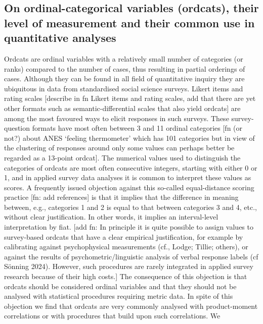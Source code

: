 \documentclass[
  12pt,
]{article}
\begin{document}
\subsection{On ordinal-categorical variables (ordcats), their level of
measurement and their common use in quantitative
analyses}\label{on-ordinal-categorical-variables-ordcats-their-level-of-measurement-and-their-common-use-in-quantitative-analyses}

Ordcats are ordinal variables with a relatively small number of
categories (or ranks) compared to the number of cases, thus resulting in
partial orderings of cases. Although they can be found in all field of
quantitative inquiry they are ubiquitous in data from standardised
social science surveys. Likert items and rating scales {[}describe in fn
Likert items and rating scales, add that there are yet other formats
such as semantic-differential scales that also yield ordcats{]} are
among the most favoured ways to elicit responses in such surveys. These
survey-question formats have most often between 3 and 11 ordinal
categories {[}fn (or not?) about ANES `feeling thermometer' which has
101 categories but in view of the clustering of responses around only
some values can perhaps better be regarded as a 13-point ordcat{]}. The
numerical values used to distinguish the categories of ordcats are most
often consecutive integers, starting with either 0 or 1, and in applied
survey data analyses it is common to interpret these values as scores. A
frequently issued objection against this so-called equal-distance
scoring practice {[}fn: add references{]} is that it implies that the
difference in meaning between, e.g., categories 1 and 2 is equal to that
between categories 3 and 4, etc., without clear justification. In other
words, it implies an interval-level interpretation by fiat. {[}add fn:
In principle it is quite possible to assign values to survey-based
ordcats that have a clear empirical justification, for example by
calibrating against psychophysical measurements (cf., Lodge; Tillie;
others), or against the results of psychometric/linguistic analysis of
verbal response labels (cf Sönning 2024). However, such procedures are
rarely integrated in applied survey research because of their high
costs.{]} The consequence of this objection is that ordcats should be
considered ordinal variables and that they should not be analysed with
statistical procedures requiring metric data. In spite of this objection
we find that ordcats are very commonly analysed with product-moment
correlations or with procedures that build upon such correlations. We
\end{document}
